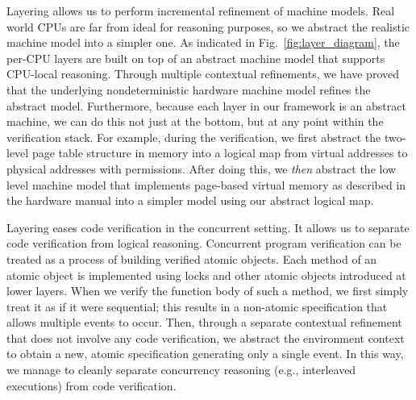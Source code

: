 Layering allows us to perform incremental refinement of machine
  models. Real world CPUs are far from ideal for reasoning
purposes, so we abstract the realistic
machine model into a simpler one.
As indicated in Fig.~\ref{fig:layer_diagram}, the per-CPU layers are built on top
of an abstract machine model that supports CPU-local reasoning. Through
multiple contextual refinements, we have proved that the underlying
nondeterministic hardware machine model refines the abstract model. Furthermore, 
because each layer in our framework
is an abstract machine, we can do this not just at
the bottom, but at any point within the verification stack. For example, 
during the \cCTOS{} verification, we first abstract the two-level page table structure
in memory into a logical map from virtual addresses to physical addresses
with permissions. After doing this, we \emph{then} abstract the low level machine 
model that implements page-based virtual memory as described in the hardware 
manual into a simpler model using our abstract logical map.

Layering eases code verification in the concurrent setting.
It allows us to separate code verification from logical reasoning.
Concurrent program verification can be treated as a process of building
verified atomic objects. Each method of an atomic object is implemented using
locks and other atomic objects introduced at lower layers.
When we verify the function body of such a method, we first simply treat it as 
if it were sequential; this results in a non-atomic specification that allows
multiple events to occur. Then, through a separate contextual refinement
that does not involve any code verification, we abstract the environment
context to obtain a new, atomic specification generating only a single event.
In this way, we manage to cleanly separate concurrency reasoning 
(e.g., interleaved executions) from code verification.

